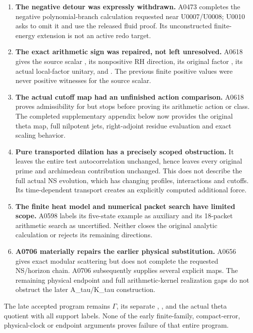 \begin{enumerate}
\def\labelenumi{\arabic{enumi}.}
\tightlist
\item
  \textbf{The negative detour was expressly withdrawn.} A0473 completes
  the negative polynomial-branch calculation requested near U0007/U0008;
  U0010 asks to omit it and use the released fluid proof. Its
  unconstructed finite-energy extension is not an active redo target.
\item
  \textbf{The exact arithmetic sign was repaired, not left unresolved.}
  A0618 gives the source scalar \protect{}, its
  nonpositive RH direction, its original factor \protect{}, its
  actual local-factor unitary, and
  \protect{}. The previous finite positive
  values were never positive witnesses for the source scalar.
\item
  \textbf{The actual cutoff map had an unfinished action comparison.}
  A0618 proves admissibility for \protect{} but
  stops before proving its arithmetic action or class. The completed
  supplementary appendix below now provides the original theta map, full
  nilpotent jets, right-adjoint residue evaluation and exact scaling
  behavior.
\item
  \textbf{Pure transported dilation has a precisely scoped obstruction.}
  It leaves the entire test autocorrelation unchanged, hence leaves
  every original prime and archimedean contribution unchanged. This does
  not describe the full actual NS evolution, which has changing
  profiles, interactions and cutoffs. Its time-dependent transport
  creates an explicitly computed additional force.
\item
  \textbf{The finite heat model and numerical packet search have limited
  scope.} A0598 labels its five-state example as auxiliary and its
  18-packet arithmetic search as uncertified. Neither closes the
  original analytic calculation or rejects its remaining directions.
\item
  \textbf{A0706 materially repairs the earlier physical substitution.}
  A0656 gives exact modular scattering but does not complete the
  requested NS/horizon chain. A0706 subsequently supplies several
  explicit maps. The remaining physical endpoint and full
  arithmetic-kernel realization gaps do not obstruct the later
  A\_tau/K\_tau construction.
\end{enumerate}

The late accepted program remains
\protect{}\allowbreak{}\ensuremath{Γ}\allowbreak{}\protect{},
its separate \protect{}, \protect{}, and the
actual theta quotient with all support labels. None of the early
finite-family, compact-error, physical-clock or endpoint arguments
proves failure of that entire program.

